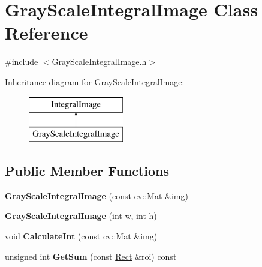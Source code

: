 \hypertarget{classGrayScaleIntegralImage}{}\section{Gray\+Scale\+Integral\+Image Class Reference}
\label{classGrayScaleIntegralImage}


{\ttfamily \#include $<$Gray\+Scale\+Integral\+Image.\+h$>$}

Inheritance diagram for Gray\+Scale\+Integral\+Image\+:\begin{figure}[H]
\begin{center}
\leavevmode
\includegraphics[height=2.000000cm]{classGrayScaleIntegralImage}
\end{center}
\end{figure}
\subsection*{Public Member Functions}
\begin{DoxyCompactItemize}
\item 
\hypertarget{classGrayScaleIntegralImage_a1b15921690e2b519fe0bc0310d303a9b}{}{\bfseries Gray\+Scale\+Integral\+Image} (const cv\+::\+Mat \&img)\label{classGrayScaleIntegralImage_a1b15921690e2b519fe0bc0310d303a9b}

\item 
\hypertarget{classGrayScaleIntegralImage_a8ca08cb9b71f23f2ca331db8ab35f144}{}{\bfseries Gray\+Scale\+Integral\+Image} (int w, int h)\label{classGrayScaleIntegralImage_a8ca08cb9b71f23f2ca331db8ab35f144}

\item 
\hypertarget{classGrayScaleIntegralImage_a234716e692aad7557fc4debc94a9780f}{}void {\bfseries Calculate\+Int} (const cv\+::\+Mat \&img)\label{classGrayScaleIntegralImage_a234716e692aad7557fc4debc94a9780f}

\item 
\hypertarget{classGrayScaleIntegralImage_aecfdc4fa33aa5a15e340eef5b5456681}{}unsigned int {\bfseries Get\+Sum} (const \hyperlink{classRect}{Rect} \&roi) const \label{classGrayScaleIntegralImage_aecfdc4fa33aa5a15e340eef5b5456681}

\end{DoxyCompactItemize}
